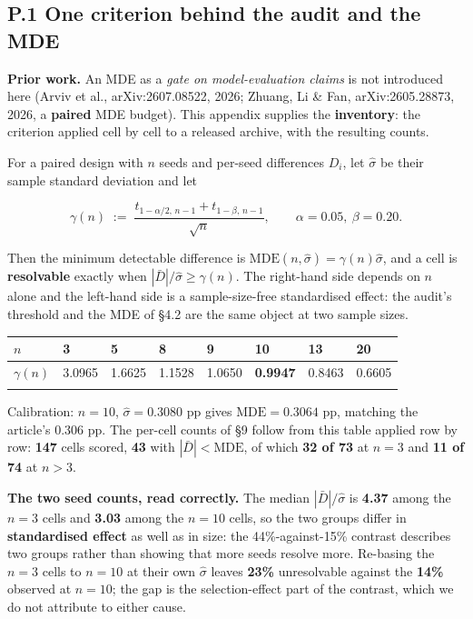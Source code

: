 \documentclass[pdflatex,sn-mathphys-ay]{sn-jnl}
\begin{document}
\subsection*{P.1 One criterion behind the audit and the MDE}

\textbf{Prior work.} An MDE as a \emph{gate on model-evaluation claims} is not introduced here (Arviv et al., arXiv:2607.08522, 2026; Zhuang, Li \& Fan, arXiv:2605.28873, 2026, a \textbf{paired} MDE budget). This appendix supplies the \textbf{inventory}: the criterion applied cell by cell to a released archive, with the resulting counts.

For a paired design with $n$ seeds and per-seed differences $D_i$, let $\hat\sigma$ be their sample standard deviation and let

\[\gamma(n)\;:=\;\frac{t_{1-\alpha/2,\,n-1}+t_{1-\beta,\,n-1}}{\sqrt n},\qquad \alpha=0.05,\ \beta=0.20 .\]

Then the minimum detectable difference is $\mathrm{MDE}(n,\hat\sigma)=\gamma(n)\hat\sigma$, and a cell is \textbf{resolvable} exactly when $|\bar D|/\hat\sigma\ge\gamma(n)$. The right-hand side depends on $n$ alone and the left-hand side is a sample-size-free standardised effect: the audit's threshold and the MDE of \S{}4.2 are the same object at two sample sizes.

\begin{center}
{\small
\begin{tabular}{llllllll}
\toprule
$n$ & 3 & 5 & 8 & 9 & \textbf{10} & 13 & 20 \\
\midrule
$\gamma(n)$ & 3.0965 & 1.6625 & 1.1528 & 1.0650 & \textbf{0.9947} & 0.8463 & 0.6605 \\
\botrule
\end{tabular}}
\end{center}

Calibration: $n=10$, $\hat\sigma=0.3080$ pp gives $\mathrm{MDE}=0.3064$ pp, matching the article's 0.306 pp. The per-cell counts of \S{}9 follow from this table applied row by row: \textbf{147} cells scored, \textbf{43} with $|\bar D|<\mathrm{MDE}$, of which \textbf{32 of 73} at $n=3$ and \textbf{11 of 74} at $n>3$.

\textbf{The two seed counts, read correctly.} The median $|\bar D|/\hat\sigma$ is \textbf{4.37} among the $n=3$ cells and \textbf{3.03} among the $n=10$ cells, so the two groups differ in \textbf{standardised effect} as well as in size: the 44\%-against-15\% contrast describes two groups rather than showing that more seeds resolve more. Re-basing the $n=3$ cells to $n=10$ at their own $\hat\sigma$ leaves \textbf{23\%} unresolvable against the \textbf{14\%} observed at $n=10$; the gap is the selection-effect part of the contrast, which we do not attribute to either cause.
\end{document}
